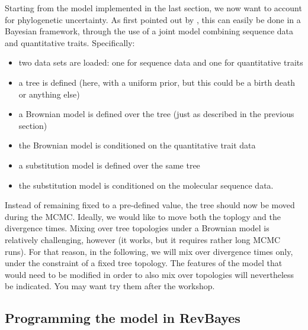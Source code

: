 \documentclass[usletter]{article}
\begin{document}
Starting from the model implemented in the last section, we now want to account for phylogenetic uncertainty. As first pointed out by \cite{Huelsenbeck:2003p999}, this can easily be done in a Bayesian framework, through the use of a joint model combining sequence data and quantitative traits. Specifically:
\begin{itemize}
\item
two data sets are loaded: one for sequence data and one for quantitative traits
\item
a tree is defined (here, with a uniform prior, but this could be a birth death or anything else)
\item
a Brownian model is defined over the tree (just as described in the previous section)
\item
the Brownian model is conditioned on the quantitative trait data
\item
a substitution model is defined over the same tree
\item
the substitution model is conditioned on the molecular sequence data.
\end{itemize}
Instead of remaining fixed to a pre-defined value,
the tree should now be moved during the MCMC.
Ideally, we would like to move both the toplogy and the divergence times.
Mixing over tree topologies under a Brownian model is relatively challenging, however
(it works, but it requires rather long MCMC runs).
For that reason, in the following, we will mix over divergence times only,
under the constraint of a fixed tree topology.
The features of the model that would need to be modified in order to also mix over topologies
will nevertheless be indicated. You may want try them after the workshop.

\subsection*{Programming the model in RevBayes}
\end{document}
